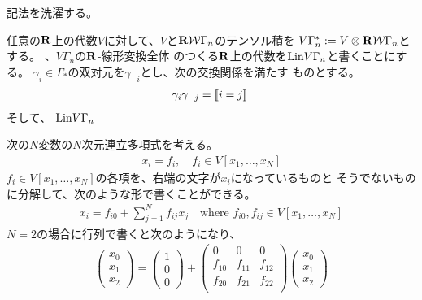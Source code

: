{	\begin{todo}[ここまで]\label{todo:ここまで} %
		記法を洗濯する。
	\end{todo} %

	任意の$\mathbf{R}$上の代数$V$に対して、$V$と$\mathbf{R}{{\mathcal{W}}}\Gamma_n$のテンソル積を
	$V\Gamma_n^*:=V\otimes\mathbf{R}{{\mathcal{W}}}\Gamma_n$とする。
	、$V\Gamma_n$の$\mathbf{R}$-線形変換全体
	のつくる$\mathbf{R}$上の代数を${\operatorname{Lin}} V\Gamma_n$と書くことにする。
	$\gamma_i\in\Gamma_*$の双対元を$\gamma_{-i}$とし、次の交換関係を満たす
	ものとする。
	\begin{equation*}\begin{split}
		\gamma_i\gamma_{-j} = [\![i=j]\!]\;
	\end{split}\end{equation*}
	そして、
${\operatorname{Lin}} V\Gamma_n$

	次の$N$変数の$N$次元連立多項式を考える。
	\begin{equation*}\begin{split}
		x_i = f_i,\quad f_i\in V[x_1,\dots,x_N]
	\end{split}\end{equation*}
	$f_i\in V[x_1,\dots,x_N]$の各項を、右端の文字が$x_i$になっているものと
	そうでないものに分解して、次のような形で書くことができる。
	\begin{equation*}\begin{split}
		x_i = f_{i0} + \sum_{j=1}^N f_{ij}x_j
		\quad\text{where } f_{i0},f_{ij}\in V[x_1,\dots,x_N]
	\end{split}\end{equation*}
	$N=2$の場合に行列で書くと次のようになり、
	\begin{equation*}\begin{split}
		\begin{pmatrix}
			x_0 \\ x_1 \\ x_2
		\end{pmatrix} = \begin{pmatrix}
			1 \\ 0 \\ 0
		\end{pmatrix} + \begin{pmatrix}
			0 & 0 & 0 \\
			f_{10} & f_{11} & f_{12} \\
			f_{20} & f_{21} & f_{22} \\
		\end{pmatrix}\begin{pmatrix}
			x_0 \\ x_1 \\ x_2

\end{pmatrix}
\end{split}
\end{equation*}}
